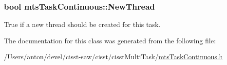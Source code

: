\subsubsection[{New\+Thread}]{\setlength{\rightskip}{0pt plus 5cm}bool mts\+Task\+Continuous\+::\+New\+Thread\hspace{0.3cm}{\ttfamily [protected]}}\label{classmts_task_continuous_a10a9569559a59e62d28ab29c6fc7636c}
True if a new thread should be created for this task. 

The documentation for this class was generated from the following file\+:\begin{DoxyCompactItemize}
\item 
/\+Users/anton/devel/cisst-\/saw/cisst/cisst\+Multi\+Task/\hyperlink{mts_task_continuous_8h}{mts\+Task\+Continuous.\+h}\end{DoxyCompactItemize}
